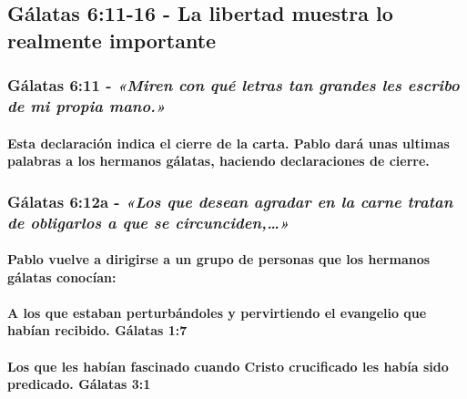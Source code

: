 \documentclass[11a pt,twoside]{article}
\newcommand{\scripture}[1]{%
  {\fontsize{12pt}{16pt}\selectfont\ScriptureFont\itshape #1}%
}
\let\oldsubsection\subsection
\renewcommand{\subsection}{\needspace{5\baselineskip}\oldsubsection}
\let\oldsubsubsection\subsubsection
\renewcommand{\subsubsection}{\needspace{4\baselineskip}\oldsubsubsection}
\let\oldparagraph\paragraph
\renewcommand{\paragraph}{\needspace{3\baselineskip}\oldparagraph}
\begin{document}
\subsection{Gálatas 6:11-16 - La libertad muestra lo realmente
importante}\label{guxe1latas-611-16---la-libertad-muestra-lo-realmente-importante}

\subsubsection{\texorpdfstring{Gálatas 6:11 -
\scripture{«Miren con qué letras tan grandes les escribo de mi propia mano.»}}{Gálatas 6:11 - }}\label{guxe1latas-611---miren-con-quuxe9-letras-tan-grandes-les-escribo-de-mi-propia-mano.}

\paragraph{Esta declaración indica el cierre de la carta. Pablo dará
unas ultimas palabras a los hermanos gálatas, haciendo declaraciones de
cierre.}\label{esta-declaraciuxf3n-indica-el-cierre-de-la-carta.-pablo-daruxe1-unas-ultimas-palabras-a-los-hermanos-guxe1latas-haciendo-declaraciones-de-cierre.}

\subsubsection{\texorpdfstring{Gálatas 6:12a -
\scripture{«Los que desean agradar en la carne tratan de obligarlos a que se circunciden,…»}}{Gálatas 6:12a - }}\label{guxe1latas-612a---los-que-desean-agradar-en-la-carne-tratan-de-obligarlos-a-que-se-circunciden}

\paragraph{Pablo vuelve a dirigirse a un grupo de personas que los
hermanos gálatas
conocían:}\label{pablo-vuelve-a-dirigirse-a-un-grupo-de-personas-que-los-hermanos-guxe1latas-conocuxedan}

\paragraph{A los que estaban perturbándoles y pervirtiendo el evangelio
que habían recibido. Gálatas
1:7}\label{a-los-que-estaban-perturbuxe1ndoles-y-pervirtiendo-el-evangelio-que-habuxedan-recibido.-guxe1latas-17}

\paragraph{Los que les habían fascinado cuando Cristo crucificado les
había sido predicado. Gálatas
3:1}\label{los-que-les-habuxedan-fascinado-cuando-cristo-crucificado-les-habuxeda-sido-predicado.-guxe1latas-31}
\end{document}
